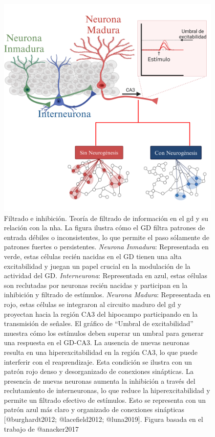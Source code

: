 \documentclass[
  11pt]{../MastersDoctoralThesisUNAM}
\begin{document}
\begin{tcolorbox}[enhanced jigsaw, colframe=quarto-callout-warning-color-frame, left=2mm, bottomrule=.15mm, rightrule=.15mm, arc=.35mm, toprule=.15mm, leftrule=.75mm, breakable, opacityback=0, colback=white]
\begin{figure}[H]
{\includegraphics[width=0.8\linewidth,height=\textheight,keepaspectratio]{../Figures/neurogenesis_inhibicion.png}

}

\caption[Filtrado e inhibición en el
\ac{gd}]{\label{fig-inhibicion}Filtrado e inhibición. Teoría de filtrado
de información en el \ac{gd} y su relación con la \ac{nha}. La figura
ilustra cómo el GD filtra patrones de entrada débiles o inconsistentes,
lo que permite el paso sólamente de patrones fuertes o persistentes.
\emph{Neurona Inmadura}: Representada en verde, estas células recién
nacidas en el GD tienen una alta excitabilidad y juegan un papel crucial
en la modulación de la actividad del GD. \emph{Interneurona}:
Representada en azul, estas células son reclutadas por neuronas recién
nacidas y participan en la inhibición y filtrado de estímulos.
\emph{Neurona Madura}: Representada en rojo, estas células se integraron
al circuito maduro del \ac{gd} y proyectan hacia la región CA3 del
hipocampo participando en la transmisión de señales. El gráfico de
``Umbral de excitabilidad'' muestra cómo los estímulos deben superar un
umbral para generar una respuesta en el GD-CA3. La ausencia de nuevas
neuronas resulta en una hiperexcitabilidad en la región CA3, lo que
puede interferir con el reaprendizaje. Esta condición se ilustra con un
patrón rojo denso y desorganizado de conexiones sinápticas. La presencia
de nuevas neuronas aumenta la inhibición a través del reclutamiento de
interneuronas, lo que reduce la hiperexcitabilidad y permite un filtrado
efectivo de estímulos. Esto se representa con un patrón azul más claro y
organizado de conexiones sinápticas {[}@burghardt2012; @lacefield2012;
@luna2019{]}. Figura basada en el trabajo de @anacker2017}


\end{figure}
\end{tcolorbox}
\end{document}
